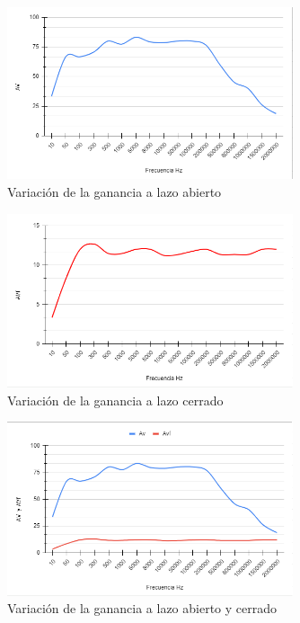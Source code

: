 \documentclass[12pt, letterpaper]{article}
\begin{document}
\begin{figure}[H]
	\centering
	\includegraphics[width=0.75\textwidth]{Imagenes/resp_frecuencia_av.png}
	\caption{Variación de la ganancia a lazo abierto}
	\label{fig:av_vs_fr}
\end{figure}
\singlespacing
\begin{figure}[H]
	\centering
	\includegraphics[width=0.75\textwidth]{Imagenes/resp_frecuencia_avf.png}
	\caption{Variación de la ganancia a lazo cerrado}
	\label{fig:avf_vs_fr}
\end{figure}
\singlespacing
\begin{figure}[H]
	\centering
	\includegraphics[width=0.75\textwidth]{Imagenes/resp_frecuencia_avf_av.png}
	\caption{Variación de la ganancia a lazo abierto y cerrado}
	\label{fig:av&avf_vs_fr}
\end{figure}
\singlespacing
\end{document}
